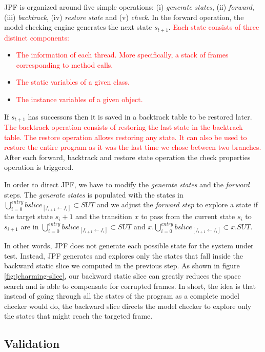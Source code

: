 \documentclass[times, doublespace]{smrauth}
\newcommand{\red}[1]{\textcolor{red}{#1}}
\begin{document}
{JPF is organized around five simple
operations: (i) {\it generate states}, (ii) {\it forward}, (iii) {\it backtrack},
(iv) {\it restore state} and (v) {\it check}.
In the forward operation, the
model checking engine generates the next state $s_{t+1}$.
\red{Each state consists of three distinct components: }
\begin{itemize}
  \item \red{The information of each thread. More specifically, a stack of frames corresponding to method calls.}
  \item \red{The static variables of a given class.}
  \item \red{The instance variables of a given object.}
\end{itemize}
If $s_{t+1}$ has successors then it is saved in a backtrack table to be
restored later. \red{The backtrack operation consists of restoring
the last state in the backtrack table. The restore operation
allows restoring any state. It can also be used to restore the entire
program as it was the last time we chose between two
branches.} After each forward, backtrack and restore state
operation the check properties operation is triggered.

In order to direct JPF, we have to modify the {\it generate states}
and the {\it forward} steps. The {\it generate states} is populated with
the states in $\bigcup_{i=0}^{entry} bslice_{[f_{i+1} \leftarrow f_i]}  \subset SUT$ and we adjust the
{\it forward step} to explore a state if the target state $s_i+1$ and the
transition $x$ to pass from the current state $s_i$ to $s_{i+1}$ are in
$\bigcup_{i=0}^{entry} bslice_{[f_{i+1} \leftarrow f_i]}  \subset SUT$ and $x.\bigcup_{i=0}^{entry} bslice_{[f_{i+1} \leftarrow f_i]}  \subset x.SUT$.

In other words, JPF does not generate each possible state for the system under test.
Instead, JPF generates and explores only the states that fall inside the backward static
slice we computed in the previous step.
As shown in figure \ref{fig:jcharming-slice}, our backward static slice can
greatly reduces the space search and is able to compensate for corrupted frames.
In short, the idea is that instead of going through all the states of the program as a
complete model checker would do, the backward slice directs the model checker to explore
only the states that might reach the targeted frame.

\subsection{Validation}

}
\end{document}
